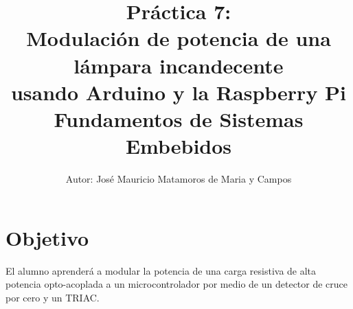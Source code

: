 \documentclass[letterpaper,10.5pt]{article}
\author{\footnotesize Autor: José Mauricio Matamoros de Maria y Campos}
\title{Práctica 7:\\Modulación de potencia de una lámpara incandecente\\usando Arduino y la Raspberry Pi\\
{\large Fundamentos de Sistemas Embebidos}}
\date{}
\begin{document}
\maketitle

\section{Objetivo}%
\label{sec:objective}
El alumno aprenderá a modular la potencia de una carga resistiva de alta potencia opto-acoplada a un microcontrolador por medio de un detector de cruce por cero y un TRIAC.



\cleardoublepage

\cleardoublepage



\appendix


\end{document}
